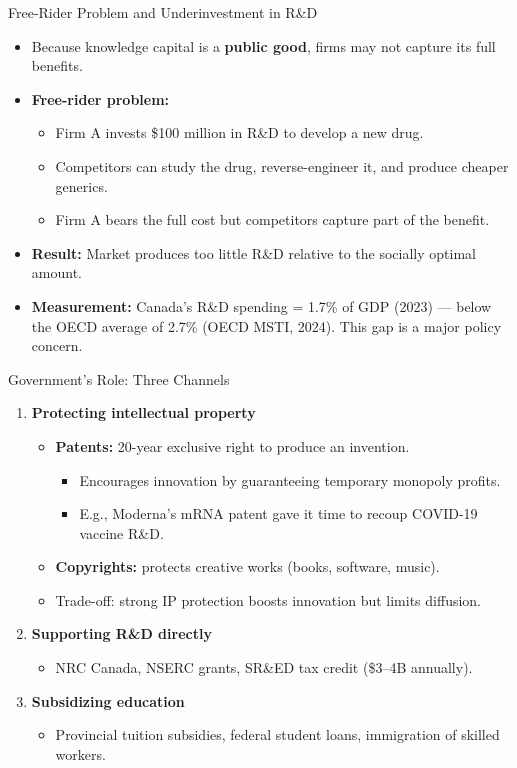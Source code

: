 \documentclass[aspectratio=169]{beamer}
\begin{document}
\begin{frame}{Free-Rider Problem and Underinvestment in R\&D}
\transfade
\begin{itemize}
  \item Because knowledge capital is a \textbf{public good}, firms may not capture its full benefits.
  \item \textbf{Free-rider problem:}
  \begin{itemize}
    \item Firm A invests \$100 million in R\&D to develop a new drug.
    \item Competitors can study the drug, reverse-engineer it, and produce cheaper generics.
    \item Firm A bears the full cost but competitors capture part of the benefit.
  \end{itemize}
  \item \textbf{Result:} Market produces \alert{too little} R\&D relative to the socially optimal amount.
  \item \textbf{Measurement:} Canada's R\&D spending = 1.7\% of GDP (2023) --- below the OECD average of 2.7\% (OECD MSTI, 2024). This gap is a major policy concern.
\end{itemize}
\end{frame}

\begin{frame}{Government's Role: Three Channels}
\transfade
\begin{enumerate}
  \item \textbf{Protecting intellectual property}
  \begin{itemize}
    \item \textbf{Patents:} 20-year exclusive right to produce an invention.
    \begin{itemize}
      \item Encourages innovation by guaranteeing temporary monopoly profits.
      \item E.g., Moderna's mRNA patent gave it time to recoup COVID-19 vaccine R\&D.
    \end{itemize}
    \item \textbf{Copyrights:} protects creative works (books, software, music).
    \item Trade-off: strong IP protection boosts innovation but limits diffusion.
  \end{itemize}
  \item \textbf{Supporting R\&D directly}
  \begin{itemize}
    \item NRC Canada, NSERC grants, SR\&ED tax credit (\$3--4B annually).
  \end{itemize}
  \item \textbf{Subsidizing education}
  \begin{itemize}
    \item Provincial tuition subsidies, federal student loans, immigration of skilled workers.
  \end{itemize}
\end{enumerate}
\end{frame}
\end{document}
